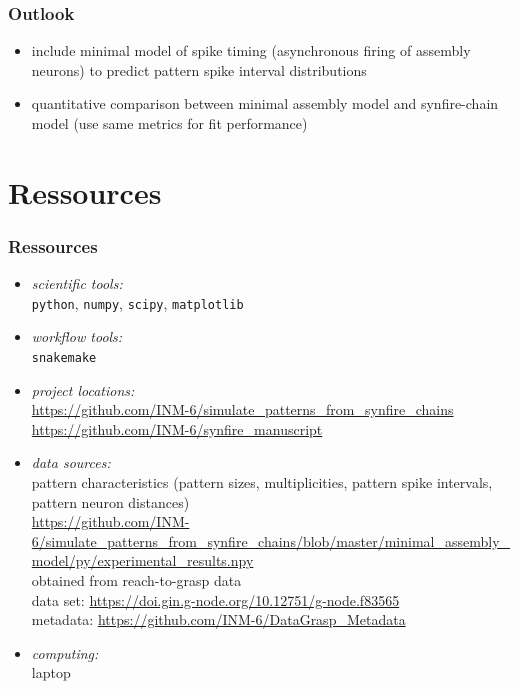 \documentclass[8pt,t,usepdftitle=false]{beamer}
\begin{document}
\def\ttl{Outlook}
\begin{frame}[plain]
  \frametitle{\ttl}
  \begin{itemize}
  \item include minimal model of spike timing (asynchronous firing of assembly neurons) to predict pattern spike interval distributions
  \item quantitative comparison between minimal assembly model and synfire-chain model (use same metrics for fit performance)
  \end{itemize}
\end{frame}
\def\ttl{Ressources}
\section{\ttl}
\begin{frame}[plain]
  \frametitle{\ttl}
  \begin{itemize}\itemsep2ex
  \item \emph{scientific tools:}\\
    \texttt{python}, \texttt{numpy}, \texttt{scipy}, \texttt{matplotlib}
  \item \emph{workflow tools:}\\
    \texttt{snakemake}
  \item \emph{project locations:}\\
    \url{https://github.com/INM-6/simulate_patterns_from_synfire_chains}\\
    \url{https://github.com/INM-6/synfire_manuscript}    
  \item \emph{data sources:}\\
    pattern characteristics (pattern sizes, multiplicities, pattern spike intervals, pattern neuron distances)\\[1ex]   \url{https://github.com/INM-6/simulate_patterns_from_synfire_chains/blob/master/minimal_assembly_model/py/experimental_results.npy}\\[1ex]
    obtained from reach-to-grasp data \parencite{Riehle13_48}\\[1ex]
    data set: \url{https://doi.gin.g-node.org/10.12751/g-node.f83565}\\
    metadata: \url{https://github.com/INM-6/DataGrasp_Metadata}   
  \item \emph{computing:}\\
    laptop
  \end{itemize}
  \end{frame}
\end{document}
